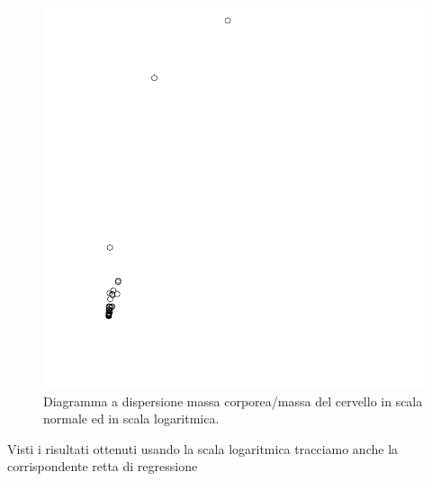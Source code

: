 \documentclass[onecolumn,12pt]{book}\usepackage[]{graphicx}\usepackage[]{color}
\makeatletter
\def\maxwidth{ %
  \ifdim\Gin@nat@width>\linewidth
    \linewidth
  \else
    \Gin@nat@width
  \fi
}
\newenvironment{knitrout}{}{} %
\makeatother
\begin{document}
\begin{figure}[htbp]
\begin{center}
\begin{knitrout}
{\centering \includegraphics[width=\maxwidth]{figure/graphics-unnamed-chunk-127-1} 

}



\end{knitrout}
\caption{Diagramma a dispersione massa corporea/massa del cervello in scala normale ed in scala logaritmica. }
\label{fig:duemammals}
\end{center}
\end{figure}
Visti i  risultati ottenuti usando la scala logaritmica tracciamo anche la corrispondente retta di regressione
\end{document}
